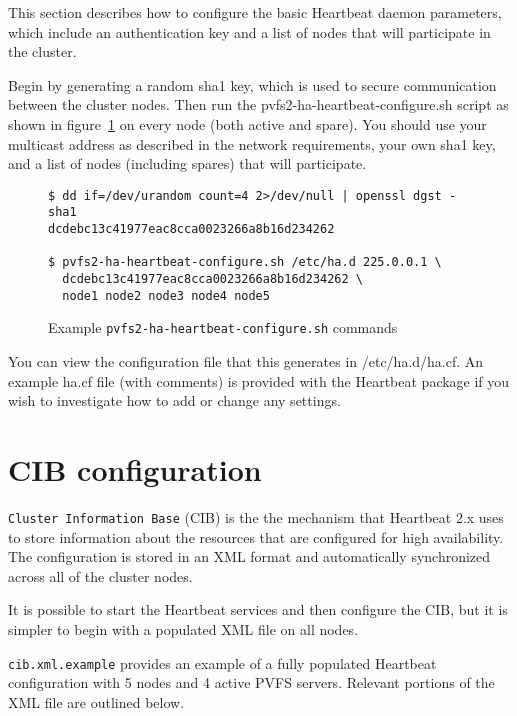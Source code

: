 \documentclass[11pt]{article}
\begin{document}
This section describes how to configure the basic Heartbeat daemon
parameters, which include an authentication key and a list of nodes that
will participate in the cluster.

Begin by generating a random sha1 key, which is used to secure
communication between the cluster nodes.  Then run the 
pvfs2-ha-heartbeat-configure.sh script as shown in
figure~\ref{fig:haconf} on every node (both active and spare).  You
should use your multicast address as described in the network
requirements, your own sha1 key, and a list of
nodes (including spares) that will participate.


\begin{figure}
\begin{scriptsize}
\begin{verbatim}
$ dd if=/dev/urandom count=4 2>/dev/null | openssl dgst -sha1
dcdebc13c41977eac8cca0023266a8b16d234262

$ pvfs2-ha-heartbeat-configure.sh /etc/ha.d 225.0.0.1 \
  dcdebc13c41977eac8cca0023266a8b16d234262 \
  node1 node2 node3 node4 node5
\end{verbatim}
\end{scriptsize}
\caption{Example \texttt{pvfs2-ha-heartbeat-configure.sh} commands}
\label{fig:haconf}
\end{figure}

You can view the configuration file that this generates in
/etc/ha.d/ha.cf.  An example ha.cf file (with comments) is provided with
the Heartbeat package if you wish to investigate how to add or change any settings.

\section{CIB configuration}

\texttt{Cluster Information Base} (CIB) is the the mechanism that
Heartbeat 2.x uses to store information about the resources that are 
configured for high availability.  The configuration is stored in an
XML format and automatically synchronized across all of the cluster
nodes.

It is possible to start the Heartbeat services and then configure the
CIB, but it is simpler to begin with a populated XML file on all nodes.

\texttt{cib.xml.example} provides an example of a fully populated
Heartbeat configuration with 5 nodes and 4 active PVFS servers.  Relevant
portions of the XML file are outlined below.
\end{document}
